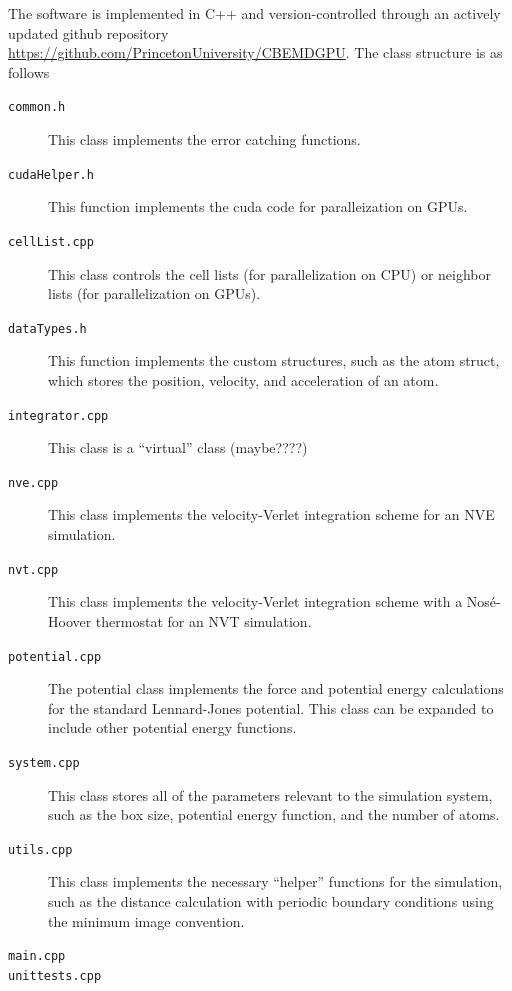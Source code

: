 The software is implemented in C++ and version-controlled through an actively updated github repository \url{https://github.com/PrincetonUniversity/CBEMDGPU}.
%
The class structure is as follows
\begin{description}

\item[\texttt{common.h}] This class implements the error catching functions.

\item[\texttt{cudaHelper.h}] This function implements the cuda code for paralleization on GPUs.

\item[\texttt{cellList.cpp}] This class controls the cell lists (for parallelization on CPU) or neighbor lists (for parallelization on GPUs).

\item[\texttt{dataTypes.h}] This function implements the custom structures, such as the atom struct, which stores the position, velocity, and acceleration of an atom.
	
\item[\texttt{integrator.cpp}] This class is a ``virtual'' class (maybe????)

\item[\texttt{nve.cpp}] This class implements the velocity-Verlet integration scheme for an NVE simulation.

\item[\texttt{nvt.cpp}] This class implements the velocity-Verlet integration scheme with a Nos\'{e}-Hoover thermostat for an NVT simulation.

\item[\texttt{potential.cpp}] The potential class implements the force and potential energy calculations for the standard Lennard-Jones potential.
%
This class can be expanded to include other potential energy functions.

\item[\texttt{system.cpp}] This class stores all of the parameters relevant to the simulation system, such as the box size, potential energy function, and the number of atoms.

\item[\texttt{utils.cpp}] This class implements the necessary ``helper'' functions for the simulation, such as the distance calculation with periodic boundary conditions using the minimum image convention.

\item[\texttt{main.cpp}]

\item[\texttt{unittests.cpp}]

\end{description}

